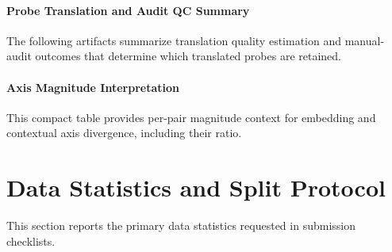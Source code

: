 \documentclass[11pt]{article}
\begin{document}
\paragraph{Probe Translation and Audit QC Summary}
The following artifacts summarize translation quality estimation and manual-audit outcomes that determine which translated probes are retained.
\begin{table}[t]
\centering
\scriptsize
\resizebox{\columnwidth}{!}{}
\caption{Probe translation QC summary for all non-English languages. QE uses COMETKiwi when available (high $\geq$ 0.80, medium [0.60, 0.80), low $<$ 0.60); table also reports manual-review flags and duplicate-target checks.}
\label{tab:appendix-probe-qc}
\end{table}

\begin{table}[t]
\centering
\scriptsize
\resizebox{\columnwidth}{!}{}
\caption{Quality-tier stratification for Experiment~2 overlap tests (COMETKiwi tiers when available; back-translation tiers otherwise).}
\label{tab:appendix-exp2-quality}
\end{table}

\paragraph{Axis Magnitude Interpretation}
This compact table provides per-pair magnitude context for embedding and contextual axis divergence, including their ratio.
\begin{table}[t]
\centering
\scriptsize
\resizebox{\columnwidth}{!}{}
\caption{Compact interpretation table for axis magnitudes by pair: embedding and contextual $D_{Axis}$ with contextual-to-embedding ratio.}
\label{tab:appendix-daxis}
\end{table}

\section{Data Statistics and Split Protocol}
\label{sec:data-stats-splits}
This section reports the primary data statistics requested in submission checklists.
\end{document}
